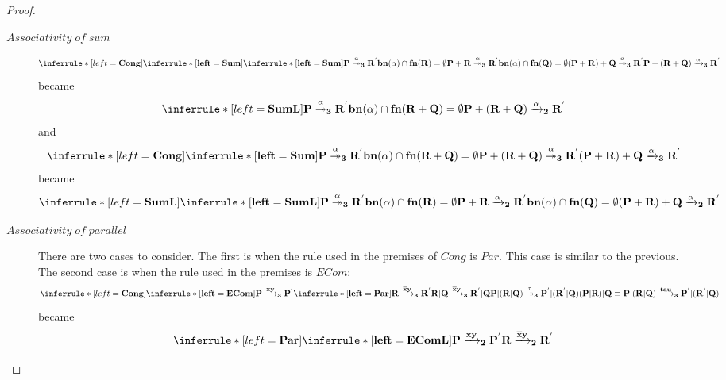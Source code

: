 \begin{theorem}
\begin{proof}
\begin{description}
\begin{description}
	  \item[$Associativity\; of\; sum$]
	    \[\inferrule* [left=\bf{Cong}]{
		\inferrule* [left=\bf{Sum}]{
		    \inferrule* [left=\bf{Sum}]{
			P \stackrel{\alpha}{\twoheadrightarrow}_{3} R^{'}
		      \\
			bn(\alpha) \cap fn(R) = \emptyset
		    }{
		      P + R \stackrel{\alpha}{\twoheadrightarrow}_{3} R^{'}
		    }
		  \\
		    bn(\alpha) \cap fn(Q) = \emptyset
		}{
		  (P + R) + Q \stackrel{\alpha}{\twoheadrightarrow}_{3} R^{'}
		}
	    }{
	      P + (R + Q) \xrightarrow{\alpha}_{3} R^{'}
	    }\]
	    became
	    \[\inferrule* [left=\bf{SumL}]{
		    P \stackrel{\alpha}{\twoheadrightarrow}_{3} R^{'}
		  \\
		    bn(\alpha) \cap fn(R+Q) = \emptyset
		}{
		  P + (R+Q) \xrightarrow{\alpha}_{2} R^{'}
	    }\]
	    and
	    \[\inferrule* [left=\bf{Cong}]{
		\inferrule* [left=\bf{Sum}]{
		    P \stackrel{\alpha}{\twoheadrightarrow}_{3} R^{'}
		  \\
		    bn(\alpha) \cap fn(R+Q) = \emptyset
		}{
		  P + (R + Q) \stackrel{\alpha}{\twoheadrightarrow}_{3} R^{'}
		}
	    }{
	      (P + R) + Q \xrightarrow{\alpha}_{3} R^{'}
	    }\]
	    became
	    \[\inferrule* [left=\bf{SumL}]{
	      \inferrule* [left=\bf{SumL}]{
		    P \stackrel{\alpha}{\twoheadrightarrow}_{3} R^{'}
		  \\
		    bn(\alpha) \cap fn(R) = \emptyset
	      }{
		  P + R \xrightarrow{\alpha}_{2} R^{'}
	      }
	      \\
		bn(\alpha) \cap fn(Q) = \emptyset
	    }{
		(P + R) + Q \xrightarrow{\alpha}_{2} R^{'}
	    }\]
	  \item[$Associativity\; of\; parallel$]
	    There are two cases to consider. The first is when the rule used in the premises of $Cong$ is $Par$. This case is similar to the previous. The second case is when the rule used in the premises is $ECom$:
	    \[\inferrule* [left=\bf{Cong}]{
		\inferrule* [left=\bf{ECom}]{
		    P \xrightarrow{xy}_{3} P^{'}
		  \\
		    \inferrule* [left=\bf{Par}]{
		      R \xrightarrow{\overline{x}y}_{3} R^{'}
		    }{
		      R|Q \xrightarrow{\overline{x}y}_{3} R^{'}|Q
		    }
		}{
		  P|(R|Q) \stackrel{\tau}{\twoheadrightarrow}_{3} P^{'}|(R^{'}|Q)
		}
	    }{
	      (P|R)|Q\equiv P|(R|Q) \xrightarrow{tau}_{3} P^{'}|(R^{'}|Q)
	    }\]
	    became
	    \[\inferrule* [left=\bf{Par}]{\inferrule* [left=\bf{EComL}]{
		    P \xrightarrow{xy}_{2} P^{'}
		  \\
		    R \xrightarrow{\overline{x}y}_{2} R^{'}
}}\]
\end{description}
\end{description}
\end{proof}
\end{theorem}
